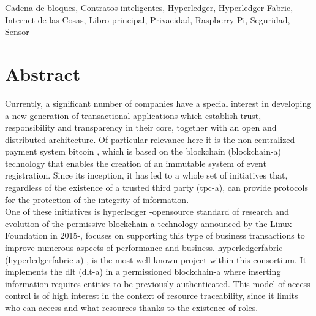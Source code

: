 \documentclass[12pt,a4paper, twoside]{report}
\begin{document}
	Cadena de bloques, Contratos inteligentes, Hyperledger, Hyperledger Fabric, Internet de las Cosas, Libro principal, Privacidad, Raspberry Pi, Seguridad, Sensor
	
	\chapter*{Abstract}
	\thispagestyle{empty}
		
	\vspace{-0.3cm}

	Currently, a significant number of companies have a special interest in developing a new generation of transactional applications which establish trust, responsibility and transparency in their core, together with an open and distributed architecture. Of particular relevance here it is the non-centralized payment system \gls{bitcoin} \cite{bitcoin}, which is based on the \Gls{blockchain} (\gls{blockchain-a}) \cite{iansiti:2017:ttab} technology that enables the creation of an immutable system of event registration. Since its inception, it has led to a whole set of initiatives that, regardless of the existence of a trusted third party (\gls{tpc-a}), can provide protocols for the protection of the integrity of information. \\
		
	One of these initiatives is \gls{hyperledger} \cite{hyperledger:url} -\gls{opensource} standard of research and evolution of the permissive \gls{blockchain-a} technology announced by the Linux Foundation in 2015-, focuses on supporting this type of business \glspl{transaction} to improve numerous aspects of performance and business. \gls{hyperledgerfabric} (\gls{hyperledgerfabric-a}) \cite{hyperledgerfabric:url}, is the most well-known project within this consortium. It implements the \gls{dlt} (\gls{dlt-a}) \cite{wattenhofer:DLT} in a permissioned \gls{blockchain-a} where inserting information requires entities to be previously authenticated. This model of access control is of high interest in the context of resource traceability, since it limits who can access and what resources thanks to the existence of roles. \\
	
\end{document}
